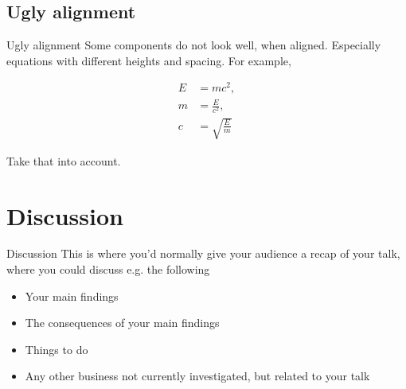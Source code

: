 \documentclass[aspectratio=169]{beamer}
\begin{document}
\subsection{Ugly alignment}
\begin{frame}{Ugly alignment}
Some components do not look well, when aligned. Especially equations with different heights and spacing. For example,

\begin{align}
E &= mc^{2}, \\
m &= \frac{E}{c^2}, \\
c &= \sqrt{\frac{E}{m}}
\end{align}

Take that into account.
\end{frame}
\section{Discussion}
\begin{frame}{Discussion}
This is where you'd normally give your audience a recap of your talk, where you could discuss e.g. the following

\begin{itemize}
    \item Your main findings
    \item The consequences of your main findings
    \item Things to do 
    \item Any other business not currently investigated, but related to your talk
\end{itemize}
\end{frame}
\end{document}

